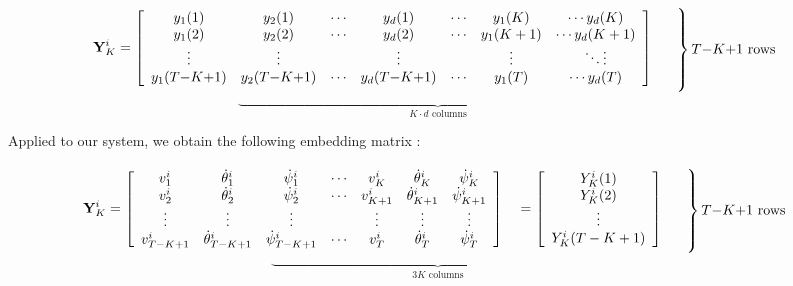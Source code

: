 \begin{equation}
\mathbf{Y}_{K}^i =
\left[
\begin{array}{ccccccc}
y_1(1) & y_2(1) & \cdots & y_d(1) & \cdots & y_1(K) & \cdots y_d(K) \\
y_1(2) & y_2(2) & \cdots & y_d(2) & \cdots & y_1(K+1) & \cdots y_d(K+1) \\
\vdots & \vdots &        & \vdots &        & \vdots & \ddots \vdots \\
y_1(T{-}K{+}1) & y_2(T{-}K{+}1) & \cdots & y_d(T{-}K{+}1) & \cdots & y_1(T) & \cdots y_d(T)
\end{array}
\right]
\quad
\begin{array}{l}
\left. \rule{0pt}{3.5em} \right\} T{-}K{+}1 \text{ rows} \\
\end{array}
\end{equation}
\begin{equation*}
\underbrace{\hspace{12cm}}_{K \cdot d \text{ columns}}
\end{equation*}

Applied to our system, we obtain the following embedding matrix :

\begin{equation}
\mathbf{Y}_{K}^i =
\left[
\begin{array}{cccccccc}
v_1^i & \dot{\theta}_1^i & \dot{\psi}_1^i & \cdots & v_K^i & \dot{\theta}_K^i & \dot{\psi}_K^i \\
v_2^i & \dot{\theta}_2^i & \dot{\psi}_2^i & \cdots & v_{K+1}^i & \dot{\theta}_{K+1}^i & \dot{\psi}_{K+1}^i \\
\vdots & \vdots & \vdots &        & \vdots & \vdots & \vdots \\
v_{T-K+1}^i & \dot{\theta}_{T-K+1}^i & \dot{\psi}_{T-K+1}^i & \cdots & v_T^i & \dot{\theta}_T^i & \dot{\psi}_T^i \\
\end{array}
\right]
\quad
=
\left[
\begin{array}{c}
Y_K^i(1) \\
Y_K^i(2) \\
\vdots \\
Y_K^i(T-K+1)
\end{array}
\right]
\quad
\begin{array}{l}
\left. \rule{0pt}{3.5em} \right\} T{-}K{+}1 \text{ rows}
\end{array}
\end{equation}
\begin{equation}
\underbrace{\hspace{10cm}}_{3K \text{ columns}}
\end{equation}


